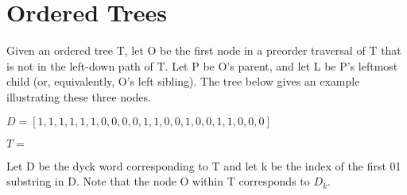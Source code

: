 \documentclass{article}
\begin{document}
\section*{Ordered Trees}


Given an ordered tree T, let O be the first node in a preorder traversal of T that is not in the left-down path of T. Let P be O's parent, and let L be P's leftmost child (or, equivalently, O's left sibling).  The tree below gives an example illustrating these three nodes. 

$D=[1, 1, 1, 1, 1, 1, 0, 0, 0, 0, 1, 1, 0, 0, 1, 0, 0, 1, 1, 0, 0, 0]$

$T=$


\noindent Let D be the dyck word corresponding to T and let k be the index of the first 01 substring in D. Note that the node O within T corresponds to $D_k$.
\end{document}

